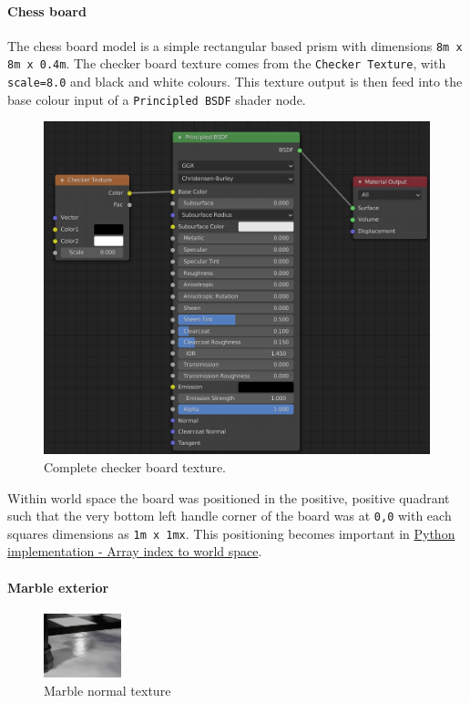 \documentclass[11pt]{article}
\begin{document}
\paragraph{Chess board}
\label{sec:orgb545b6c}
The chess board model is a simple rectangular based prism with dimensions \texttt{8m x
8m x 0.4m}. The checker board texture comes from the \texttt{Checker Texture}, with
\texttt{scale=8.0} and black and white colours. This texture output is then feed into
the base colour input of a \texttt{Principled BSDF} shader node.\\

\begin{figure}[htbp]
\centering
\includegraphics[width=350pt]{Images/checker texture.png}
\caption{\label{checker-texture}Complete checker board texture.}
\end{figure}

Within world space the board was positioned in the positive, positive quadrant
such that the very bottom left handle corner of the board was at \texttt{0,0}
with each squares dimensions as \texttt{1m x 1mx}. This positioning becomes important
in \hyperref[sec:orgd755ba3]{Python implementation - Array index to world space}.
\newpage
\paragraph{Marble exterior}
\label{sec:orgecd2be3}
\begin{figure}
\centering
\includegraphics[width=0.2\textwidth]{Images/normal.png}
\caption{\label{marble-normal-texture}Marble normal texture}
\end{figure}
\end{document}
